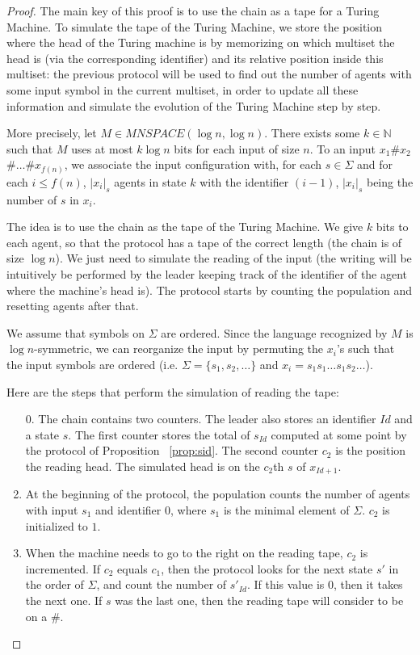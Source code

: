 \documentclass[UKenglish]{llncs}
\begin{document}
\begin{proof}
  The main key of this proof is to use the chain 
  as a tape for a Turing Machine. To simulate the tape of
  the Turing Machine, we store the position where the head of the
  Turing machine is by memorizing on which multiset the head is (via
  the corresponding identifier) and its relative position inside this
  multiset: the previous protocol will be used to find out the number of
  agents with some input symbol in the current multiset, in order to
  update all these information and simulate the evolution
  of the Turing Machine  step by step.

More precisely, let $M\in MNSPACE(\log n, \log n)$. There exists some $k\in\mathbb{N}$ such that $M$ uses at most $k\log n$ bits
for each input of size $n$.
 To an input $x_1$\#$x_2$\#$\ldots$\#$x_{f(n)}$, we associate the input configuration
with, for each $s\in\Sigma$ and for each $i\le f(n)$, $|x_i|_{s}$ agents in state $k$ with the identifier $(i-1)$,
 $|x_i|_{s}$ being the number of $s$ in $x_i$.

The idea is to use the chain as the tape of the Turing Machine. We
give $k$ bits to each agent,  so that
the protocol  has a tape of the correct length (the chain is of size $\log n$).
We just need to simulate the reading of the input (the writing
will be intuitively be performed by the leader keeping track of the identifier
of the agent where the machine's head is).
The protocol starts by counting the population and resetting agents after that.

We assume that symbols on $\Sigma$ are ordered. Since the language recognized by $M$ is $\log n$-symmetric, we can reorganize the input by permuting the $x_i$'s
such that the input symbols are ordered (i.e. $\Sigma=\{s_1,s_2,\ldots\}$ and 
$x_i=s_1s_1\ldots s_1s_2\ldots$).

Here are the steps that perform the simulation of reading the tape: 
\begin{enumerate}
\item[0.] The chain contains two counters. The leader also stores an identifier $Id$ and a state $s$.
The first counter stores the total of $s_{Id}$ computed at some point by the protocol of
Proposition~ \ref{prop:sid}. The second counter $c_2$ is the position the reading head.
The simulated head is on the $c_2$th $s$ of $x_{Id+1}$.
\item At the beginning of the protocol, the population counts the number of agents with input $s_1$
and identifier $0$, where $s_1$ is the minimal
element of $\Sigma$. $c_2$ is initialized to $1$.
\item When the machine needs to go to the right on the reading tape, $c_2$
  is incremented. If $c_2$ equals $c_1$, then
the protocol looks for the next state $s'$ in the order of $\Sigma$, and count the number of $s'_{Id}$. If this
value is $0$, then it takes the next one. If $s$ was the last one, then the reading tape will consider to be on a \#.


\end{enumerate}
\end{proof}
\end{document}
